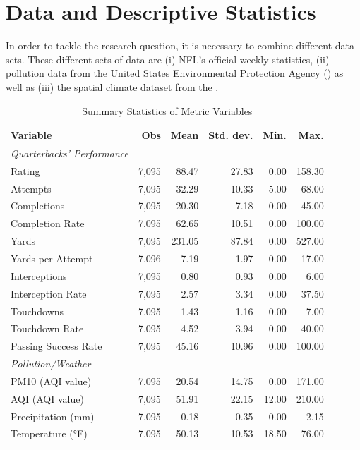 \documentclass[12pt,a4paper]{article}
\begin{document}
\clearpage

\section{Data and Descriptive Statistics}
In order to tackle the research question, it is necessary to combine different data sets. These different sets of data are (i) NFL's official weekly statistics, (ii) pollution data from the United States Environmental Protection Agency (\citeauthor{EPA}) as well as (iii) the spatial climate dataset from the \citeauthor{PRISM}. 



\begin{table}[h]
  \centering
  \caption{Summary Statistics of Metric Variables}
  \label{tab:1}
  \begin{tabular}{lrrrrr}
    \hline \hline
    Variable & Obs & Mean & Std. dev. & Min. & Max. \\
    \hline
    \textit{Quarterbacks' Performance} \\
    Rating & 7,095 & 88.47 & 27.83 & 0.00 & 158.30 \\
    Attempts & 7,095 & 32.29 & 10.33 & 5.00 & 68.00 \\
    Completions & 7,095 & 20.30 & 7.18 & 0.00 & 45.00 \\
    Completion Rate & 7,095 & 62.65 & 10.51 & 0.00 & 100.00 \\
    Yards & 7,095 & 231.05 & 87.84 & 0.00 & 527.00 \\
    Yards per Attempt & 7,096 & 7.19 & 1.97 & 0.00 & 17.00 \\
    Interceptions & 7,095 & 0.80 & 0.93 & 0.00 & 6.00 \\
    Interception Rate & 7,095 & 2.57 & 3.34 & 0.00 & 37.50 \\
    Touchdowns & 7,095 & 1.43 & 1.16 & 0.00 & 7.00 \\
    Touchdown Rate & 7,095 & 4.52 & 3.94 & 0.00 & 40.00 \\
    Passing Success Rate & 7,095 & 45.16 & 10.96 & 0.00 & 100.00 \\ [0.5cm]
    \textit{Pollution/Weather} \\
    PM10 (AQI value) & 7,095 & 20.54 & 14.75 & 0.00 & 171.00 \\
    AQI (AQI value) & 7,095 & 51.91 & 22.15 & 12.00 & 210.00 \\
    Precipitation (mm) & 7,095 & 0.18 & 0.35 & 0.00 & 2.15 \\
    Temperature (°F) & 7,095 & 50.13 & 10.53 & 18.50 & 76.00 \\
    \hline \hline
  \end{tabular}
\end{table}
\end{document}
